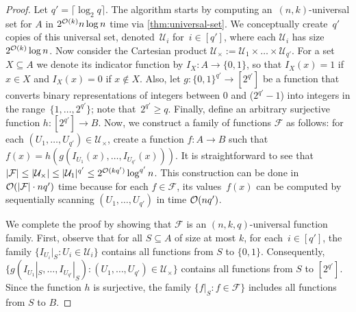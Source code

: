 \begin{proof}
  Let $q'= \lceil \log_2 q \rceil$.
	The algorithm starts by computing an~$(n,k)$-universal set for $A$ in $2^{\mathcal{O}(k)} n \log n$ time via \cref{thm:universal-set}.
	We conceptually create~$q'$ copies of this universal set, denoted~$\mathcal{U}_i$ for~$i \in [q']$,
	where each $\mathcal{U}_i$ has size $2^{\mathcal{O}(k)} \log n$.
	Now consider the Cartesian product $\mathcal{U}_{\times} := \mathcal{U}_1 \times \ldots \times \mathcal{U}_{q'}$. 
  For a set $X \subseteq A$ we denote its indicator function by $I_X \colon A \to \{0,1\}$, so that $I_X(x) = 1$ if $x \in X$ and $I_X(x)=0$ if $x \not\in X$.
  Also, let $g \colon \{0,1\}^{q'} \to [2^{q'}]$ be a function that converts binary representations of
  integers between $0$ and ($2^{q'}-1$) into integers in the range~$\{1, \ldots, 2^{q'}\}$; note that~$2^{q'} \geq q$.
	Finally, define an arbitrary surjective function $h: [2^{q'}] \to B$.
  Now, we construct a family of functions $\mathcal{F}$ as follows:
  for each $(U_1,\ldots,U_{q'}) \in \mathcal{U}_\times$,
  create a function $f \colon A \to B$ such that
	$f(x)=h(g(I_{U_1}(x), \ldots, I_{U_{q'}}(x)))$.
  It is straightforward to see that $|\mathcal{F}| \leq |\mathcal{U}_\times| \leq |\mathcal{U}_1|^{q'} \leq 2^{\mathcal{O}(kq')}\log^{q'}n$.
  This construction can be done in $\mathcal{O}(|\mathcal{F}|\cdot nq')$ time
  because for each $f \in \mathcal{F}$, its values~$f(x)$ can be computed by sequentially scanning $(U_1,\ldots,U_{q'})$ in time $\mathcal{O}(nq')$.

  We complete the proof by showing that $\mathcal{F}$ is an $(n,k,q)$-universal function family.
  First, observe that for all $S \subseteq A$ of size at most $k$, for each~$i \in [q']$, 
  the family $\{I_{U_i}|_S \colon U_i \in \mathcal{U}_i\}$ contains all functions from $S$ to $\{0,1\}$.
  Consequently, $\{ g(I_{U_1}|_S, \ldots, I_{U_{q'}}|_S) \colon (U_1,\ldots,U_{q'}) \in \mathcal{U}_\times \}$ contains all functions from $S$ to $[2^{q'}]$.
	Since the function $h$ is surjective,
	the family $\{{f|}_S : f \in \mathcal{F} \}$ includes all functions from $S$ to $B$.
\end{proof}

